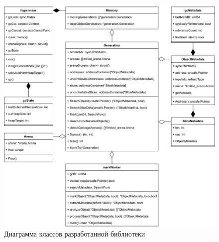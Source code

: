 \begin{figure}[H]
	\centering
	\includegraphics[width=\textwidth]{assets/uml.png}
	\caption{Диаграмма классов разработанной библиотеки}
	\label{fig:struct}
\end{figure}

%
%
%
%
%
%

